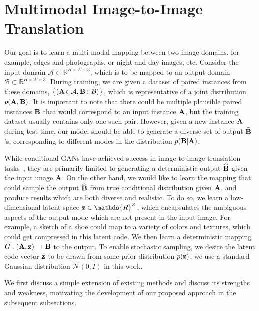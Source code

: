 \section{Multimodal Image-to-Image Translation}
\label{sec:methods}
Our goal is to learn a multi-modal mapping between two image domains, for example, edges and photographs, or night and day images, etc. 
Consider the input domain $\mathcal{A}\!\subset\!\mathds{R}^{H\!\times W\!\times 3}$, which is to be mapped to an output domain $\mathcal{B}\!\subset\!\mathds{R}^{H\!\times W\!\times 3}$. 
During training, we are given a dataset of paired instances from these domains, $\big\{(\mathbf{A}\!\in\!\mathcal{A}, \mathbf{B}\!\in\!\mathcal{B})\big\}$, which is representative of a joint distribution $p(\mathbf{A},\mathbf{B})$.
It is important to note that there could be multiple plausible paired instances $\mathbf{B}$ that would correspond to an input instance $\mathbf{A}$, but the training dataset usually contains only one such pair.
However, given a new instance $\mathbf{A}$ during test time, our model should be able to generate a diverse set of output $\widehat{\mathbf{B}}$'s, corresponding to different modes in the distribution $p(\mathbf{B}|\mathbf{A})$.

While conditional GANs have achieved success in image-to-image translation tasks~\citep{pathakCVPR16context,sangkloy2017scribbler,xian2017texturegan,yang2016high,isola2016image,zhu2017unpaired}, they are primarily limited to generating a deterministic output $\widehat{\mathbf{B}}$ given the input image $\mathbf{A}$. 
On the other hand, we would like to learn the mapping that could sample the output $\widehat{\mathbf{B}}$ from true conditional distribution given $\mathbf{A}$, and produce results which are both diverse and realistic.
To do so, we learn a low-dimensional latent space $\z \in \mathds{R}^{Z}$, which encapsulates the ambiguous aspects of the output mode which are not present in the input image. For example, a sketch of a shoe could map to a variety of colors and textures, which could get compressed in this latent code. We then learn a deterministic mapping $G:(\mathbf{A},\mathbf{z})\rightarrow \mathbf{B}$ to the output. To enable stochastic sampling, we desire the latent code vector $\mathbf{z}$ to be drawn from some prior distribution $p(\mathbf{z})$; we use a standard Gaussian distribution $\mathcal{N}(0,I)$ in this work.

We first discuss a simple extension of existing methods and discuss its strengths and weakness, motivating the development of our proposed approach in the subsequent subsections.

